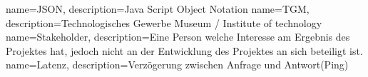 \makeglossaries
{} {name=JSON, description={Java Script Object Notation}}
 {name=TGM, description={Technologisches Gewerbe Museum / Institute of technology}}
 {name=Stakeholder, description={Eine Person welche Interesse am Ergebnis des Projektes hat, jedoch nicht an der Entwicklung des Projektes an sich beteiligt ist.}}
 {name=Latenz, description={Verzögerung zwischen Anfrage und Antwort(Ping)}}
\renewcommand*\glspostdescription{\dotfill}

